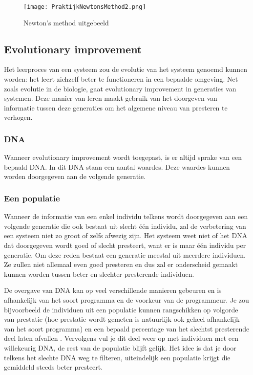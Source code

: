 \begin{figure}[H]
  \centering
    \texttt{[image: PraktijkNewtonsMethod2.png]}
  \caption{Newton's method uitgebeeld}
  \label{fig:PraktijkNewtonsMethod2}
\end{figure}

\subsection{Evolutionary improvement}
Het leerproces van een systeem zou de evolutie van het systeem genoemd kunnen worden: het leert zichzelf beter te functioneren in een bepaalde omgeving. Net zoals evolutie in de biologie, gaat evolutionary improvement in generaties van systemen. Deze manier van leren maakt gebruik van het doorgeven van informatie tussen deze generaties om het algemene niveau van presteren te verhogen.

\subsubsection{DNA}
Wanneer evolutionary improvement wordt toegepast, is er altijd sprake van een bepaald DNA. In dit DNA staan een aantal waardes. Deze waardes kunnen worden doorgegeven aan de volgende generatie.

\subsubsection{Een populatie}
Wanneer de informatie van een enkel individu telkens wordt doorgegeven aan een volgende generatie die ook bestaat uit slecht \'{e}\'{e}n individu, zal de verbetering van een systeem niet zo groot of zelfs afwezig zijn. Het systeem weet niet of het DNA dat doorgegeven wordt goed of slecht presteert, want er is maar \'{e}\'{e}n individu per generatie. Om deze reden bestaat een generatie meestal uit meerdere individuen. Ze zullen niet allemaal even goed presteren en dus zal er onderscheid gemaakt kunnen worden tussen beter en slechter presterende individuen.

De overgave van DNA kan op veel verschillende manieren gebeuren en is afhankelijk van het soort programma en de voorkeur van de programmeur. Je zou bijvoorbeeld de individuen uit een populatie kunnen rangschikken op volgorde van prestatie (hoe prestatie wordt gemeten is natuurlijk ook geheel afhankelijk van het soort programma) en een bepaald percentage van het slechtst presterende deel laten afvallen \cite{carrykh}. Vervolgens vul je dit deel weer op met individuen met een willekeurig DNA, de rest van de populatie blijft gelijk. Het idee is dat je door telkens het slechte DNA weg te filteren, uiteindelijk een populatie krijgt die gemiddeld steeds beter presteert.

